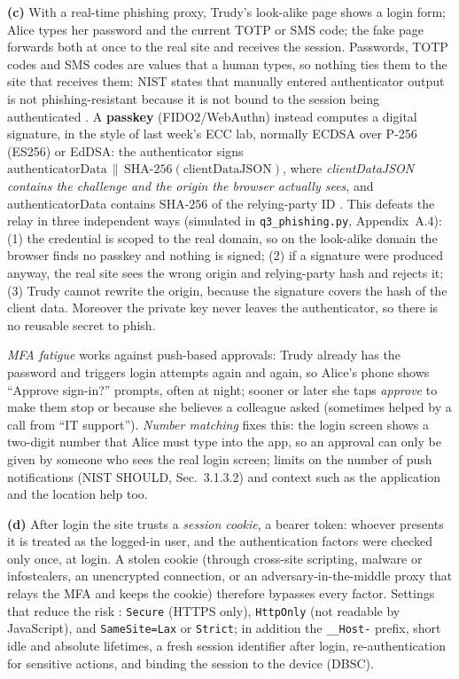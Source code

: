 \documentclass[11pt,a4paper]{article}
\begin{document}
\textbf{(c)} With a real-time phishing proxy, Trudy's look-alike page shows a login form; Alice types her
password and the current TOTP or SMS code; the fake page forwards both at once to the real site and receives
the session. Passwords, TOTP codes and SMS codes are values that a human types, so nothing ties them to the
site that receives them: NIST states that manually entered authenticator output is not phishing-resistant because
it is not bound to the session being authenticated \cite{nist63b4}. A \textbf{passkey} (FIDO2/WebAuthn) instead
computes a digital signature, in the style of last week's ECC lab, normally ECDSA over P-256 (ES256) or EdDSA: the
authenticator signs $\text{authenticatorData}\,\|\,\mathrm{SHA\text{-}256}(\text{clientDataJSON})$, where
\emph{clientDataJSON contains the challenge and the origin the browser actually sees}, and authenticatorData
contains $\mathrm{SHA\text{-}256}$ of the relying-party ID \cite{webauthn}. This defeats the relay in three
independent ways (simulated in \texttt{q3\_phishing.py}, Appendix~A.4): (1) the credential is scoped to the real
domain, so on the look-alike domain the browser finds no passkey and nothing is signed; (2) if a signature were
produced anyway, the real site sees the wrong origin and relying-party hash and rejects it; (3) Trudy cannot
rewrite the origin, because the signature covers the hash of the client data. Moreover the private key never
leaves the authenticator, so there is no reusable secret to phish.

\emph{MFA fatigue} works against push-based approvals: Trudy already has the password and triggers login
attempts again and again, so Alice's phone shows ``Approve sign-in?'' prompts, often at night; sooner or later
she taps \emph{approve} to make them stop or because she believes a colleague asked (sometimes helped by a call
from ``IT support''). \emph{Number matching} fixes this: the login screen shows a two-digit number that Alice must
type into the app, so an approval can only be given by someone who sees the real login screen; limits on the
number of push notifications (NIST SHOULD, Sec.~3.1.3.2) and context such as the application and the location
help too.

\textbf{(d)} After login the site trusts a \emph{session cookie}, a bearer token: whoever presents it is treated
as the logged-in user, and the authentication factors were checked only once, at login. A stolen cookie (through
cross-site scripting, malware or infostealers, an unencrypted connection, or an adversary-in-the-middle proxy that
relays the MFA and keeps the cookie) therefore bypasses every factor. Settings that reduce the risk
\cite{nist63b4}: \texttt{Secure} (HTTPS only), \texttt{HttpOnly} (not readable by JavaScript), and
\texttt{SameSite=Lax} or \texttt{Strict}; in addition the \texttt{\_\_Host-} prefix, short idle and absolute
lifetimes, a fresh session identifier after login, re-authentication for sensitive actions, and binding the
session to the device (DBSC).
\end{document}
